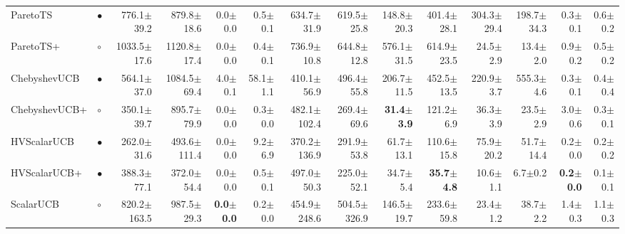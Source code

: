 \begin{tabular}{llrrrrrrrrrrrr}
ParetoTS & $\bullet$ & 776.1{\scriptsize$\pm$39.2} & 879.8{\scriptsize$\pm$18.6} & 0.0{\scriptsize$\pm$0.0} & 0.5{\scriptsize$\pm$0.1} & 634.7{\scriptsize$\pm$31.9} & 619.5{\scriptsize$\pm$25.8} & 148.8{\scriptsize$\pm$20.3} & 401.4{\scriptsize$\pm$28.1} & 304.3{\scriptsize$\pm$29.4} & 198.7{\scriptsize$\pm$34.3} & 0.3{\scriptsize$\pm$0.1} & 0.6{\scriptsize$\pm$0.2}\\
ParetoTS+ & $\circ$ & 1033.5{\scriptsize$\pm$17.6} & 1120.8{\scriptsize$\pm$17.4} & 0.0{\scriptsize$\pm$0.0} & 0.4{\scriptsize$\pm$0.1} & 736.9{\scriptsize$\pm$10.8} & 644.8{\scriptsize$\pm$12.8} & 576.1{\scriptsize$\pm$31.5} & 614.9{\scriptsize$\pm$23.5} & 24.5{\scriptsize$\pm$2.9} & 13.4{\scriptsize$\pm$2.0} & 0.9{\scriptsize$\pm$0.2} & 0.5{\scriptsize$\pm$0.2}\\
ChebyshevUCB & $\bullet$ & 564.1{\scriptsize$\pm$37.0} & 1084.5{\scriptsize$\pm$69.4} & 4.0{\scriptsize$\pm$0.1} & 58.1{\scriptsize$\pm$1.1} & 410.1{\scriptsize$\pm$56.9} & 496.4{\scriptsize$\pm$55.8} & 206.7{\scriptsize$\pm$11.5} & 452.5{\scriptsize$\pm$13.5} & 220.9{\scriptsize$\pm$3.7} & 555.3{\scriptsize$\pm$4.6} & 0.3{\scriptsize$\pm$0.1} & 0.4{\scriptsize$\pm$0.4}\\
ChebyshevUCB+ & $\circ$ & 350.1{\scriptsize$\pm$39.7} & 895.7{\scriptsize$\pm$79.9} & 0.0{\scriptsize$\pm$0.0} & 0.3{\scriptsize$\pm$0.0} & 482.1{\scriptsize$\pm$102.4} & 269.4{\scriptsize$\pm$69.6} & \textbf{31.4{\scriptsize$\pm$3.9}} & 121.2{\scriptsize$\pm$6.9} & 36.3{\scriptsize$\pm$3.9} & 23.5{\scriptsize$\pm$2.9} & 3.0{\scriptsize$\pm$0.6} & 0.3{\scriptsize$\pm$0.1}\\
HVScalarUCB & $\bullet$ & 262.0{\scriptsize$\pm$31.6} & 493.6{\scriptsize$\pm$111.4} & 0.0{\scriptsize$\pm$0.0} & 9.2{\scriptsize$\pm$6.9} & 370.2{\scriptsize$\pm$136.9} & 291.9{\scriptsize$\pm$53.8} & 61.7{\scriptsize$\pm$13.1} & 110.6{\scriptsize$\pm$15.8} & 75.9{\scriptsize$\pm$20.2} & 51.7{\scriptsize$\pm$14.4} & 0.2{\scriptsize$\pm$0.0} & 0.2{\scriptsize$\pm$0.2}\\
HVScalarUCB+ & $\bullet$ & 388.3{\scriptsize$\pm$77.1} & 372.0{\scriptsize$\pm$54.4} & 0.0{\scriptsize$\pm$0.0} & 0.5{\scriptsize$\pm$0.1} & 497.0{\scriptsize$\pm$50.3} & 225.0{\scriptsize$\pm$52.1} & 34.7{\scriptsize$\pm$5.4} & \textbf{35.7{\scriptsize$\pm$4.8}} & 10.6{\scriptsize$\pm$1.1} & 6.7{\scriptsize$\pm$0.2} & \textbf{0.2{\scriptsize$\pm$0.0}} & 0.1{\scriptsize$\pm$0.1}\\
ScalarUCB & $\circ$ & 820.2{\scriptsize$\pm$163.5} & 987.5{\scriptsize$\pm$29.3} & \textbf{0.0{\scriptsize$\pm$0.0}} & 0.2{\scriptsize$\pm$0.0} & 454.9{\scriptsize$\pm$248.6} & 504.5{\scriptsize$\pm$326.9} & 146.5{\scriptsize$\pm$19.7} & 233.6{\scriptsize$\pm$59.8} & 23.4{\scriptsize$\pm$1.2} & 38.7{\scriptsize$\pm$2.2} & 1.4{\scriptsize$\pm$0.3} & 1.1{\scriptsize$\pm$0.3}\\

\end{tabular}
